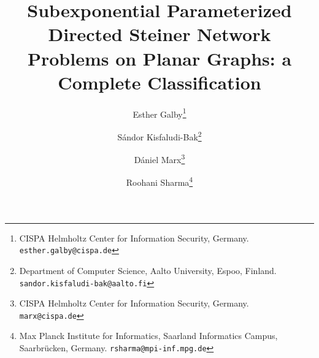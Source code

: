\documentclass[a4paper,11pt]{article}
\title{Subexponential Parameterized Directed Steiner Network Problems on Planar Graphs: a Complete Classification}
\author{Esther Galby\thanks{CISPA Helmholtz Center for Information Security, Germany. \texttt{esther.galby@cispa.de}} \and S\' andor Kisfaludi-Bak\thanks{Department of Computer Science, Aalto University, Espoo, Finland. \texttt{sandor.kisfaludi-bak@aalto.fi}} \and D\' aniel Marx\thanks{CISPA Helmholtz Center for Information Security, Germany. \texttt{marx@cispa.de}}\and  Roohani Sharma\thanks{Max Planck Institute for Informatics, Saarland Informatics Campus, Saarbr\"ucken, Germany.  \texttt{rsharma@mpi-inf.mpg.de}}}
\date{}
\begin{document}
 \maketitle

\thispagestyle{empty}
\begin{abstract}
 
\end{abstract}
\newpage
\tableofcontents
\newpage
\setcounter{page}{1}











\end{document}

